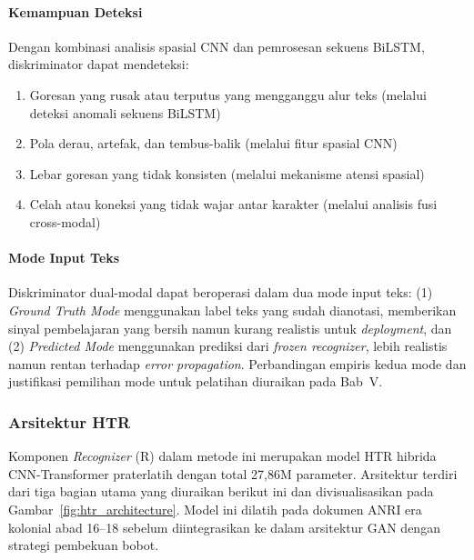 \documentclass[12pt,a4paper]{article}
\begin{document}
\paragraph{Kemampuan Deteksi}

Dengan kombinasi analisis spasial CNN dan pemrosesan sekuens BiLSTM, diskriminator dapat mendeteksi:
\begin{enumerate}[label=\alph*., leftmargin=1.5em, labelsep=0.5em, itemindent=0pt, noitemsep, topsep=0pt]
  \item Goresan yang rusak atau terputus yang mengganggu alur teks (melalui deteksi anomali sekuens BiLSTM)
  \item Pola derau, artefak, dan tembus-balik (melalui fitur spasial CNN)
  \item Lebar goresan yang tidak konsisten (melalui mekanisme atensi spasial)
  \item Celah atau koneksi yang tidak wajar antar karakter (melalui analisis fusi cross-modal)
\end{enumerate}

\paragraph{Mode Input Teks}

Diskriminator dual-modal dapat beroperasi dalam dua mode input teks: (1) \textit{Ground Truth Mode} menggunakan label teks yang sudah dianotasi, memberikan sinyal pembelajaran yang bersih namun kurang realistis untuk \textit{deployment}, dan (2) \textit{Predicted Mode} menggunakan prediksi dari \textit{frozen recognizer}, lebih realistis namun rentan terhadap \textit{error propagation}. Perbandingan empiris kedua mode dan justifikasi pemilihan mode untuk pelatihan diuraikan pada Bab~V.


\subsubsection{Arsitektur HTR}
\label{subsubsec:frozen-recognizer}

Komponen \textit{Recognizer} (R) dalam metode ini merupakan model HTR hibrida CNN-Transformer praterlatih dengan total 27,86M parameter. Arsitektur terdiri dari tiga bagian utama yang diuraikan berikut ini dan divisualisasikan pada Gambar~\ref{fig:htr_architecture}. Model ini dilatih pada dokumen ANRI era kolonial abad 16--18 sebelum diintegrasikan ke dalam arsitektur GAN dengan strategi pembekuan bobot.
\end{document}
